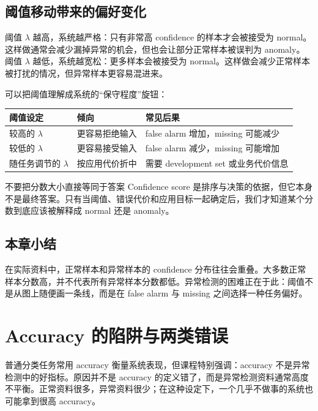 \documentclass[a4paper]{article}
\begin{document}
\subsection{阈值移动带来的偏好变化}

阈值 $\lambda$ 越高，系统越严格：只有非常高 confidence 的样本才会被接受为 normal。这样做通常会减少漏掉异常的机会，但也会让部分正常样本被误判为 anomaly。阈值 $\lambda$ 越低，系统越宽松：更多样本会被接受为 normal。这样做会减少正常样本被打扰的情况，但异常样本更容易混进来。

可以把阈值理解成系统的“保守程度”旋钮：
\begin{center}
\begin{tabular}{L{3.0cm} L{4.8cm} L{4.8cm}}
\toprule
阈值设定 & 倾向 & 常见后果 \\
\midrule
较高的 $\lambda$ & 更容易拒绝输入 & false alarm 增加，missing 可能减少 \\
较低的 $\lambda$ & 更容易接受输入 & false alarm 减少，missing 可能增加 \\
随任务调节的 $\lambda$ & 按应用代价折中 & 需要 development set 或业务代价信息 \\
\bottomrule
\end{tabular}
\end{center}

\begin{knowledgebox}{不要把分数大小直接等同于答案}
    Confidence score 是排序与决策的依据，但它本身不是最终答案。只有当阈值、错误代价和应用目标一起确定后，我们才知道某个分数到底应该被解释成 normal 还是 anomaly。
\end{knowledgebox}

\subsection{本章小结}

在实际资料中，正常样本和异常样本的 confidence 分布往往会重叠。大多数正常样本分数高，并不代表所有异常样本分数都低。异常检测的困难正在于此：阈值不是从图上随便画一条线，而是在 false alarm 与 missing 之间选择一种任务偏好。

\section{Accuracy 的陷阱与两类错误}

普通分类任务常用 accuracy 衡量系统表现，但课程特别强调：accuracy 不是异常检测中的好指标。原因并不是 accuracy 的定义错了，而是异常检测资料通常高度不平衡。正常资料很多，异常资料很少；在这种设定下，一个几乎不做事的系统也可能拿到很高 accuracy。
\end{document}
